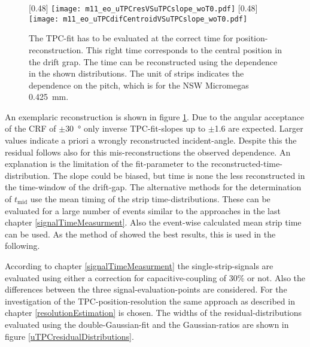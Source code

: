 \documentclass[
twoside,            %
BCOR1.4cm,          %
10pt,               %
headings=normal,    %
headsepline,        %
clearplainpage,		%
final,              %
div=14,
open=right,
bibliography=toc
]{scrreprt}
\begin{document}
\begin{figure}[!h]
	\centering
	[0.48\textwidth]
	{\texttt{[image: m11\_eo\_uTPCresVSuTPCslope\_woT0.pdf]}}
	\hfill
	[0.48\textwidth]
	{\texttt{[image: m11\_eo\_uTPCdifCentroidVSuTPCslope\_woT0.pdf]}}
	\vspace{-2mm}
	\caption{
		The \textmu TPC-fit has to be evaluated at the correct time for position-reconstruction.
		This right time corresponds to the central position in the drift grap.
		The time can be reconstructed using the dependence in the shown distributions.
		The unit of strips indicates the dependence on the pitch, which is for the NSW Micromegas \SI{0.425}{mm}.
	}
	\label{tmidDetermination}
\end{figure}

An exemplaric reconstruction is shown in figure \ref{tmidDetermination}.
Due to the angular acceptance of the CRF of $\pm$\SI{30}{\degree} only inverse \textmu TPC-fit-slopes up to $\pm$1.6 are expected.
Larger values indicate a priori a wrongly reconstructed incident-angle.
Despite this the residual follows also for this mis-reconstructions the observed dependence.
An explanation is the limitation of the fit-parameter to the reconstructed-time-distribution.
The slope could be biased, but time is none the less reconstructed in the time-window of the drift-gap.
The alternative methods for the determination of $t_{\mathrm{mid}}$ use the mean timing of the strip time-distributions.
These can be evaluated for a large number of events similar to the approaches in the last chapter \ref{signalTimeMeasurment}.
Also the event-wise calculated mean strip time can be used.
As the method of \cite{flierlThesis} showed the best results, this is used in the following.

According to chapter \ref{signalTimeMeasurment} the single-strip-signals are evaluated using either a correction for capacitive-coupling of 30\% or not.
Also the differences between the three signal-evaluation-points are considered.
For the investigation of the \textmu TPC-position-resolution the same approach as described in chapter \ref{resolutionEstimation} is chosen.
The widths of the residual-distributions evaluated using the double-Gaussian-fit and the Gaussian-ratios are shown in figure \ref{uTPCresidualDistributions}.
\end{document}
